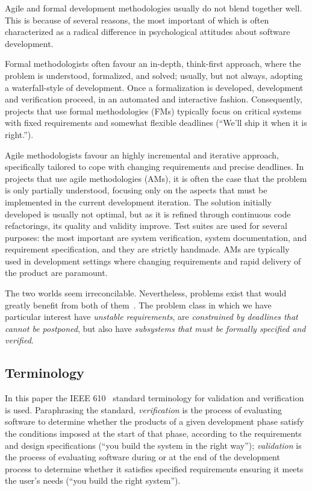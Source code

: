 \documentclass{article}
\begin{document}
Agile and formal development methodologies usually do not blend together well.  
This is because of several reasons, the most important of which is often characterized as a radical difference in psychological attitudes about software development.  

Formal methodologists often favour an in-depth, think-first approach, where the problem is understood, formalized, and solved; usually, but not always, adopting a waterfall-style of development.  
Once a formalization is developed, development and verification proceed, in an automated and interactive fashion.  
Consequently, projects that use formal methodologies (FMs) typically focus on critical systems with fixed requirements and somewhat flexible deadlines (``We'll ship it when it is right.'').

Agile methodologists favour an highly incremental and iterative approach, specifically tailored to cope with changing requirements and precise deadlines.  
In projects that use agile methodologies (AMs), it is often the case that the problem is only partially understood, focusing only on the aspects that must be implemented in the current development iteration.  
The solution initially developed is usually not optimal, but as it is refined through continuous code refactorings, its quality and validity improve.  
Test suites are used for several purposes: the most important are system verification, system documentation, and requirement specification, and they are strictly handmade.  
AMs are typically used in development settings where changing requirements and rapid delivery of the product are paramount.

The two worlds seem irreconcilable.  
Nevertheless, problems exist that would greatly benefit from both of them~\cite{Black2009}.  
The problem class in which we have particular interest have \emph{unstable requirements}, are \emph{constrained by deadlines that cannot be postponed}, but also have \emph{subsystems that must be formally specified and verified}.


\subsection{Terminology}
\label{sec:terminology}

In this paper the IEEE 610~\cite{Jay1990} standard terminology for validation and verification is used.  
Paraphrasing the standard, \emph{verification} is the process of evaluating software to determine whether the products of a given development phase satisfy the conditions imposed at the start of that phase, according to the requirements and design specifications (``you build the system in the right way''); \emph{validation} is the process of evaluating software during or at the end of the development process to determine whether it satisfies specified requirements ensuring it meets the user's needs (``you build the right system'').
\end{document}
